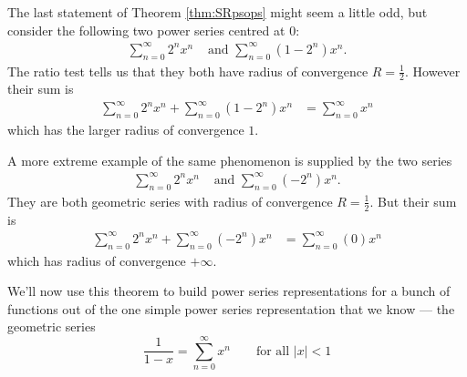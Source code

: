 \begin{eg}
The last statement of Theorem \ref{thm:SRpsops} might seem a little odd,
but consider the following two power series centred at $0$:
\begin{align*}
  \sum_{n=0}^\infty 2^n x^n & \text{ and } \sum_{n=0}^\infty (1-2^n) x^n.
\end{align*}
The ratio test tells us that they both have radius of convergence $R=\frac{1}{2}$. However their sum is
\begin{align*}
  \sum_{n=0}^\infty 2^n x^n + \sum_{n=0}^\infty (1-2^n) x^n
  &= \sum_{n=0}^\infty x^n
\end{align*}
which has the larger radius of convergence $1$.

A more extreme example of the same phenomenon is supplied by the two series
\begin{align*}
  \sum_{n=0}^\infty 2^n x^n & \text{ and } \sum_{n=0}^\infty (-2^n) x^n.
\end{align*}
They are both geometric series with radius of convergence $R=\frac{1}{2}$.
But their sum is
\begin{align*}
  \sum_{n=0}^\infty 2^n x^n + \sum_{n=0}^\infty (-2^n) x^n
  &= \sum_{n=0}^\infty (0)x^n
\end{align*}
which has radius of convergence $+\infty$.
\end{eg}

We'll now use this theorem to build power series representations
for a bunch of functions out of the one simple power
series representation that we know --- the geometric series
\begin{equation*}
\frac{1}{1-x} = \sum_{n=0}^\infty x^n\qquad \text{for all $|x|<1$}
\end{equation*}

